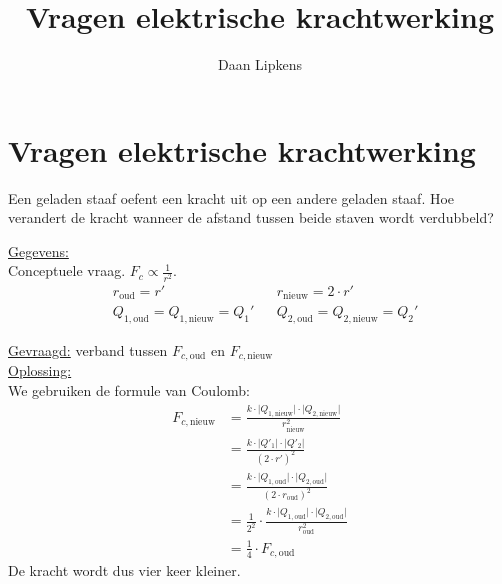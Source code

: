 \documentclass{ximera}
\title{Vragen elektrische krachtwerking}
\author{Daan Lipkens}
\begin{document}
\begin{abstract}
\end{abstract}
\maketitle
\label{vragen:coulombkracht}
\section{Vragen elektrische krachtwerking}
\begin{question}
    Een geladen staaf oefent een kracht uit op een andere geladen staaf. Hoe verandert de kracht wanneer de afstand tussen beide staven wordt verdubbeld?

    \begin{solution}\nl
        \underline{Gegevens:}\\
        Conceptuele vraag. $F_{c}\propto \tfrac{1}{r^{2}}$.\\
        
            \begin{align*}
                &r_{\text{oud}}=r' & & r_{\text{nieuw}}=2\cdot r'\\
                &Q_{1,\text{oud}} =Q_{1,\text{nieuw}} = Q_{1}' & & Q_{2,\text{oud}} =Q_{2,\text{nieuw}} = Q_{2}'
            \end{align*}
        
    \underline{Gevraagd:} verband tussen $F_{c,\text{oud}}$ en $F_{c,\text{nieuw}}$ \\

    \underline{Oplossing:}\\

    We gebruiken de formule van Coulomb:
        \begin{align*}
            F_{c,\text{nieuw}}&=\frac{k\cdot\lvert Q_{1,\text{nieuw}}\rvert\cdot\lvert Q_{2,\text{nieuw}}\rvert}{r_{\text{nieuw}}^{2}}\\
            &=\frac{k\cdot\lvert Q'_{1}\rvert\cdot\lvert Q'_{2}\rvert}{(2\cdot r')^{2}}\\
            &=\frac{k\cdot\lvert Q_{1,\text{oud}}\rvert\cdot\lvert Q_{2,\text{oud}}\rvert}{(2\cdot r_{\text{oud}})^{2}}\\
            &=\frac{1}{2^{2}}\cdot\frac{k\cdot\lvert Q_{1,\text{oud}}\rvert\cdot\lvert Q_{2,\text{oud}}\rvert}{r_{\text{oud}}^{2}}\\
            &=\frac{1}{4}\cdot F_{c,\text{oud}}
        \end{align*}
    De kracht wordt dus vier keer kleiner.\\
    \end{solution}

\end{question}
\end{document}

